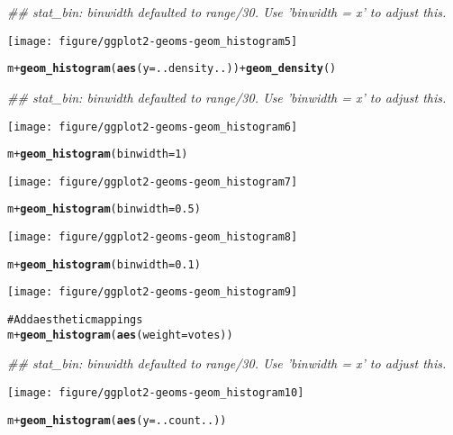\documentclass[a4paper,titlepage]{tufte-handout}\usepackage{graphicx, color}
\makeatletter
\def\maxwidth{ %
  \ifdim\Gin@nat@width>\linewidth
    \linewidth
  \else
    \Gin@nat@width
  \fi
}
\newcommand{\hlfunctioncall}[1]{\textcolor[rgb]{0.501960784313725,0,0.329411764705882}{\textbf{#1}}}%
\newcommand{\hlcomment}[1]{\textcolor[rgb]{0.180392156862745,0.6,0.341176470588235}{#1}}%
\newenvironment{kframe}{%
 \def\at@end@of@kframe{}%
 \ifinner\ifhmode%
  \def\at@end@of@kframe{\end{minipage}}%
  \begin{minipage}{\columnwidth}%
 \fi\fi%
 \def\FrameCommand##1{\hskip\@totalleftmargin \hskip-\fboxsep
 \colorbox{shadecolor}{##1}\hskip-\fboxsep
     \hskip-\linewidth \hskip-\@totalleftmargin \hskip\columnwidth}%
 \MakeFramed {\advance\hsize-\width
   \@totalleftmargin\z@ \linewidth\hsize
   \@setminipage}}%
 {\par\unskip\endMakeFramed%
 \at@end@of@kframe}
\newenvironment{knitrout}{}{} %
\makeatother
\begin{document}
\begin{knitrout}
\begin{kframe}
{\ttfamily\noindent\itshape\textcolor{messagecolor}{\#\# stat\_bin: binwidth defaulted to range/30. Use 'binwidth = x' to adjust this.}}\end{kframe}\texttt{[image: figure/ggplot2-geoms-geom\_histogram5]} \begin{kframe}\begin{alltt}
m + \hlfunctioncall{geom_histogram}(\hlfunctioncall{aes}(y = ..density..)) + \hlfunctioncall{geom_density}()
\end{alltt}


{\ttfamily\noindent\itshape\textcolor{messagecolor}{\#\# stat\_bin: binwidth defaulted to range/30. Use 'binwidth = x' to adjust this.}}\end{kframe}\texttt{[image: figure/ggplot2-geoms-geom\_histogram6]} \begin{kframe}\begin{alltt}
m + \hlfunctioncall{geom_histogram}(binwidth = 1)
\end{alltt}
\end{kframe}\texttt{[image: figure/ggplot2-geoms-geom\_histogram7]} \begin{kframe}\begin{alltt}
m + \hlfunctioncall{geom_histogram}(binwidth = 0.5)
\end{alltt}
\end{kframe}\texttt{[image: figure/ggplot2-geoms-geom\_histogram8]} \begin{kframe}\begin{alltt}
m + \hlfunctioncall{geom_histogram}(binwidth = 0.1)
\end{alltt}
\end{kframe}\texttt{[image: figure/ggplot2-geoms-geom\_histogram9]} \begin{kframe}\begin{alltt}
\hlcomment{# Add aesthetic mappings}
m + \hlfunctioncall{geom_histogram}(\hlfunctioncall{aes}(weight = votes))
\end{alltt}


{\ttfamily\noindent\itshape\textcolor{messagecolor}{\#\# stat\_bin: binwidth defaulted to range/30. Use 'binwidth = x' to adjust this.}}\end{kframe}\texttt{[image: figure/ggplot2-geoms-geom\_histogram10]} \begin{kframe}\begin{alltt}
m + \hlfunctioncall{geom_histogram}(\hlfunctioncall{aes}(y = ..count..))
\end{alltt}



\end{kframe}
\end{knitrout}
\end{document}
